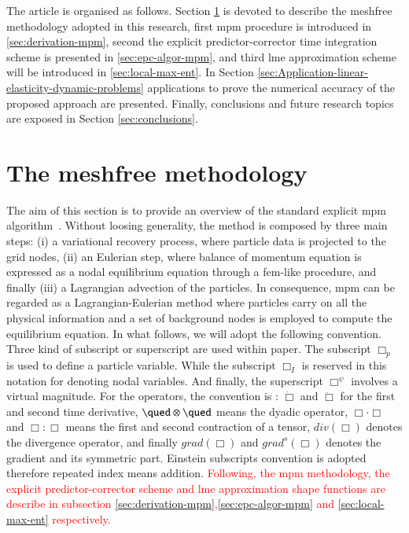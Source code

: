 \documentclass[preprint,12pt,a4paper]{elsarticle}
\newcommand{\Div}[1]{
  \ensuremath{div({#1})}
}
\newcommand\Grad[1]{grad({#1})}
\newcommand\GradS[1]{grad^s({#1})}
\newcommand{\PNA}[1]{
  \textcolor{red}{{#1}}
}
\begin{document}
The article is organised as follows. Section \ref{sec:meshfree-methodology}
is devoted to describe the meshfree methodology adopted in this
research, first \acrshort{mpm} procedure is introduced in
\ref{sec:derivation-mpm}, second the explicit predictor-corrector
time integration scheme is presented in \ref{sec:epc-algor-mpm}, and
third \acrshort{lme} approximation scheme will be introduced in
\ref{sec:local-max-ent}. In Section
\ref{sec:Application-linear-elasticity-dynamic-problems} applications
to prove the numerical accuracy of the proposed approach are
presented. Finally, conclusions and future research topics are exposed in Section \ref{sec:conclusions}.


\section{The meshfree methodology}
\label{sec:meshfree-methodology}

The aim of this section is to provide an overview of the standard
explicit \acrshort{mpm} algorithm~\cite{Sulsky1994}. Without loosing
generality, the method is composed by three main steps: (i) a
variational recovery process, where particle data is projected to the
grid nodes, (ii) an Eulerian step, where balance of momentum equation
is expressed as a nodal equilibrium equation through a \acrshort{fem}-like
procedure, and finally (iii) a Lagrangian advection of the
particles. In consequence, \acrshort{mpm} can be regarded as a
Lagrangian-Eulerian method where particles carry on all the physical
information and a set of background nodes is employed to
compute the equilibrium equation. In what follows, we will adopt the
following convention. Three kind of subscript or superscript are used
within paper. The subscript $\Box_p$ is used to define a particle
variable. While the subscript $\Box_I$ is reserved in this notation for denoting nodal
variables. And finally, the superscript $\Box^{\psi}$ involves a
virtual magnitude. For the operators, the convention is : $\dot{\Box}$ and
$\ddot{\Box}$ for the first and second time derivative, $\qued \otimes
\qued$ means the dyadic operator, $\Box \cdot \Box$ and $\Box \colon \Box$ means the
first and second contraction of a tensor, $\Div{\Box}$ denotes the
divergence operator, and finally $\Grad{\Box}$ and $\GradS{\Box}$
denotes the gradient and its symmetric part. Einstein subscripts
convention is adopted therefore repeated index means addition.\PNA{Following, the \acrshort{mpm} methodology, the explicit predictor-corrector scheme and \acrshort{lme} approximation shape functions are describe in subsection \ref{sec:derivation-mpm},\ref{sec:epc-algor-mpm} and \ref{sec:local-max-ent} respectively.}
\end{document}
